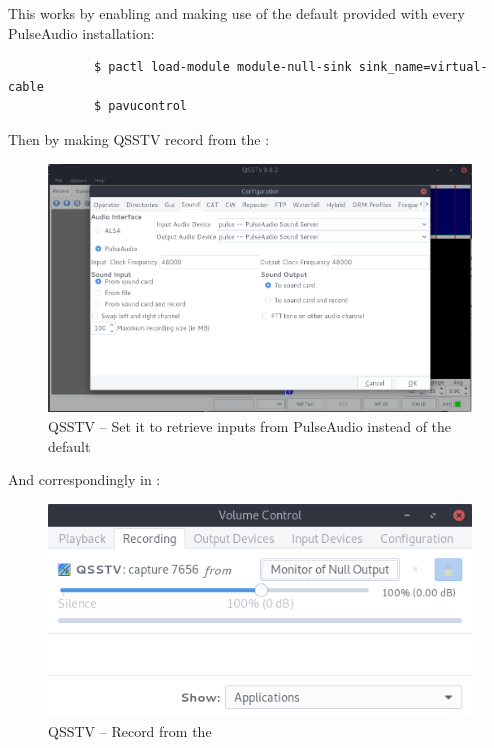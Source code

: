 		\pagebreak
		This works by enabling and making use of the default  provided with every PulseAudio installation:

		\begin{verbatim}
			$ pactl load-module module-null-sink sink_name=virtual-cable
			$ pavucontrol
		\end{verbatim}

		Then by making QSSTV record from the :

		\begin{figure}[!htbp]
			\centering
			\includegraphics[width=120mm]{figures/sstv/settings.png} \vspace{5mm}
			\caption{QSSTV -- Set it to retrieve inputs from PulseAudio instead of the default }
		\end{figure}

		And correspondingly in :

		\begin{figure}[!htbp]
			\centering
			\includegraphics[width=120mm]{figures/sstv/pavu.png} \vspace{5mm}
			\caption{QSSTV -- Record from the }
		\end{figure}

